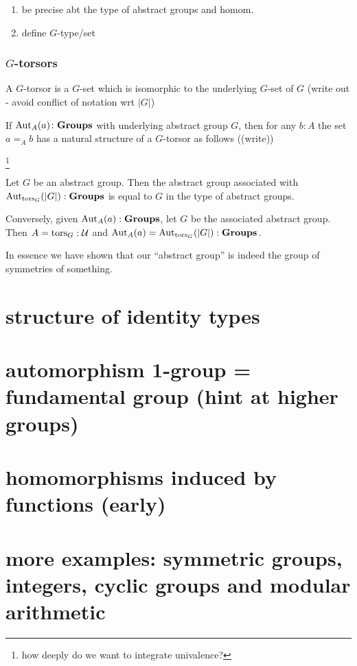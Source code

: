 \begin{enumerate}
\item be precise abt the type of abstract groups and homom.
\item define $G$-type/set
\end{enumerate}
\subsubsection{$G$-torsors}
\label{sec:Gtorsors}
\begin{definition}
  A $G$-torsor is a $G$-set which is isomorphic to the underlying $G$-set of $G$ (write out - avoid conflict of notation wrt $|G|$)
\end{definition}
\begin{example}
  If $\mathrm{Aut}_A(a)\colon\mathbf{Groups}$ with underlying abstract group $G$, then for any $b:A$ the set $a=_Ab$ has a natural structure of a $G$-torsor as follows ((write))
\end{example}

\footnote{how deeply do we want to integrate univalence?}
\begin{lemma}
  \label{lem:Groupsareidentitytypes}Let $G$ be an abstract group.  Then the abstract group associated with $\mathrm{Aut}_{\mathrm{tors}_G}(|G|):\mathbf{Groups}$ is equal to $G$ in the type of abstract groups.

Conversely, given $\mathrm{Aut}_A(a):\mathbf{Groups}$, let $G$ be the associated abstract group.  Then $A=\mathrm{tors}_G:\mathcal U$ and $\mathrm{Aut}_A(a)=\mathrm{Aut}_{\mathrm{tors}_G}(|G|):\mathbf{Groups}$.
\end{lemma}
In essence we have shown that our ``abstract group'' is indeed the group of symmetries of something.

\section{structure of identity types}
\section{automorphism 1-group = fundamental group (hint at higher groups)}
\section{homomorphisms induced by functions (early)}
\section{more examples: symmetric groups, integers, cyclic groups and modular arithmetic}

